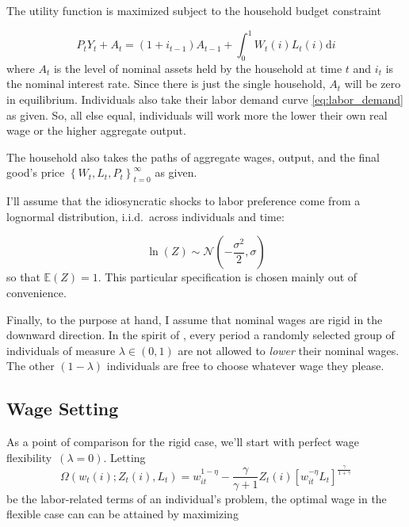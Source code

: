 \documentclass[12pt,a4paper]{scrartcl}            %
\begin{document}
The utility function is maximized subject to the household budget constraint

\begin{equation}
    \label{eq:budget}
    P_t Y_t + A_t = \left(1 + i_{t-1}\right)A_{t-1} + \int_{0}^{1}\! W_t(i)L_t(i)\mathrm{d}i
\end{equation}
%
where $A_t$ is the level of nominal assets held by the household at time $t$ and $i_t$ is the nominal interest rate.
Since there is just the single household, $A_t$ will be zero in equilibrium.
Individuals also take their labor demand curve \eqref{eq:labor_demand} as given.
So, all else equal, individuals will work more the lower their own real wage or the higher aggregate output.

The household also takes the paths of aggregate wages, output, and the final good's price $\left\{W_t, L_t, P_t \right\}_{t=0}^{\infty}$ as given.

I'll assume that the idiosyncratic shocks to labor preference come from a lognormal distribution, i.i.d.\ across individuals and time:

\begin{equation}
    \label{eq:shock_dist}
    \ln(Z) \sim \mathcal{N}\left(-\frac{\sigma^2}{2}, \sigma\right)
\end{equation}
%
so that $\mathbb{E}(Z) = 1$.
This particular specification is chosen mainly out of convenience.


Finally, to the purpose at hand, I assume that nominal wages are rigid in the downward direction.
In the spirit of \cite{calvo_1983}, every period a randomly selected group of individuals of measure $\lambda \in \left(0, 1\right)$ are not allowed to \emph{lower} their nominal wages.
The other $\left(1 - \lambda \right)$ individuals are free to choose whatever wage they please.
\subsection{Wage Setting}
\label{sub:wage_setting}

As a point of comparison for the rigid case, we'll start with perfect wage flexibility~$(\lambda = 0)$.
Letting
\begin{equation}
    \label{eq:labor_part}
    \Omega( w_t(i); Z_t(i), L_t ) = w_{it}^{1 - \eta} - \frac{\gamma}{\gamma + 1}Z_t(i)\left[ w_{it}^{-\eta}L_t \right]^{\frac{\gamma}{1 + \gamma}}
\end{equation}
%
be the labor-related terms of an individual's problem, the optimal wage in the flexible case can can be attained by maximizing
\end{document}
